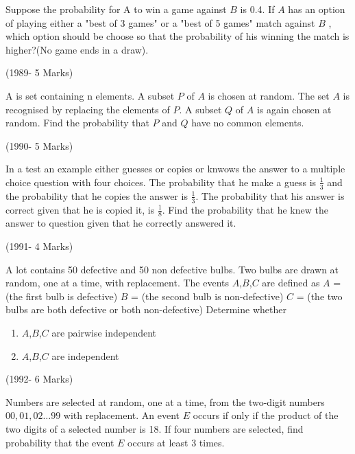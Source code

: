 \iffalse
  \title{Assignment-2}
  \author{Geedi Harsha}
  \section{subjective}
\fi


\item Suppose the probability for $\text{A}$ to win a game against $B$ is 0.4. If $A$ has an option of playing either a "best of 3 games" or a "best of 5 games" match against $B$ , which option should be choose so that the probability of his winning the match is higher?(No game ends in a draw).

\hfill(1989- 5 Marks)

\item A is set containing n elements. A subset $P$ of $A$ is chosen at random. The set $A$ is recognised by replacing the elements of $P$. A subset $Q$ of $A$ is again chosen at random. Find the probability that $P$ and $Q$ have no common elements.


\hfill(1990- 5 Marks)

\item In a test an example either guesses or copies or knwows the answer to a multiple choice question with four choices. The probability that he make a guess is $\frac{1}{3}$ and the probability that he copies the answer is $\frac{1}{3}$. The probability that his answer is correct given that he is copied it, is $\frac{1}{8}$. Find the probability that he knew the answer to question given that he correctly answered it.

\hfill(1991- 4 Marks)



\item A lot contains 50 defective and 50 non defective bulbs. Two bulbs are drawn at random, one at a time, with replacement. The events $A$,$B$,$C$ are defined as 
$A$ = (the first bulb is defective)
$B$ = (the second bulb is non-defective)
$C$ = (the two bulbs are both defective or both non-defective)
Determine whether
\begin{enumerate}
\item $A$,$B$,$C$ are pairwise independent
\item $A$,$B$,$C$ are independent
\end{enumerate}

\hfill(1992- 6 Marks)

\item Numbers are selected at random, one at a time, from the two-digit numbers $00, 01, 02 \dots 99 $ with replacement. An event $E$ occurs if only if the product of the two digits of a selected number is 18. If four numbers are selected, find probability that the event $E$ occurs at least 3 times.

